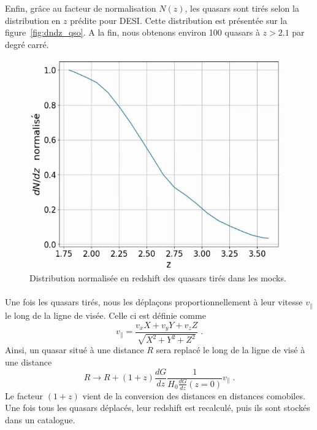 \documentclass[11pt, twoside, a4paper, openright]{report}
\begin{document}
Enfin, grâce au facteur de normalisation $N(z)$, les quasars sont tirés selon la distribution en $z$ prédite pour DESI. Cette distribution est présentée sur la figure~\ref{fig:dndz_qso}. A la fin, nous obtenons environ \num{100} quasars à $z > \num{2.1}$ par degré carré.
\begin{figure}
  \centering
  \includegraphics[scale=0.5]{dndz_qso}
  \caption{Distribution normalisée en redshift des quasars tirés dans les mocks.}
\end{figure}

\paragraph{}
Une fois les quasars tirés, nous les déplaçons proportionnellement à leur vitesse $v_{\parallel}$ le long de la ligne de visée. Celle ci est définie comme
\begin{equation}
  v_{\parallel} = \frac{v_x X + v_y Y + v_z Z}{\sqrt{X^2 + Y^2 + Z^2}} \; .
\end{equation}
Ainsi, un quasar situé à une distance $R$ sera replacé le long de la ligne de visé à une distance
\begin{equation}
 R \rightarrow  R + (1+z) \frac{dG}{dz} \frac{1}{H_0 \frac{dG}{dz}(z=0)} v_{\parallel} \; .
\end{equation}
Le facteur $(1+z)$ vient de la conversion des distances en distances comobiles. Une fois tous les quasars déplacés, leur redshift est recalculé, puis ils sont stockés dans un catalogue.
\end{document}
